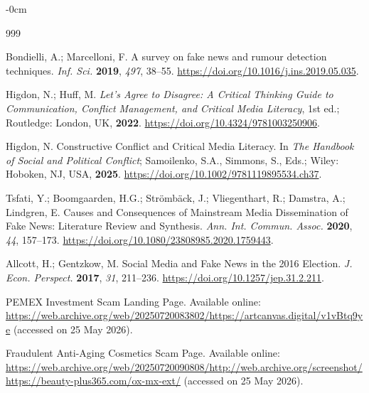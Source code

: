 \documentclass[informatics,article,submit,pdftex,moreauthors]{Definitions/mdpi}
\begin{document}
\begin{adjustwidth}{-\extralength}{0cm}


\begin{thebibliography}{999}
 
 
Bondielli, A.; Marcelloni, F. A survey on fake news and rumour detection techniques. \textit{Inf. Sci.} \textbf{2019}, \textit{497}, 38--55. \href{https://doi.org/10.1016/j.ins.2019.05.035}{https://doi.org/10.1016/j.ins.2019.05.035}.
 
Higdon, N.; Huff, M. \textit{Let's Agree to Disagree: A Critical Thinking Guide to Communication, Conflict Management, and Critical Media Literacy}, 1st ed.; Routledge: London, UK, \textbf{2022}. \href{https://doi.org/10.4324/9781003250906}{https://doi.org/10.4324/9781003250906}.
 
Higdon, N. Constructive Conflict and Critical Media Literacy. In \textit{The Handbook of Social and Political Conflict}; Samoilenko, S.A., Simmons, S., Eds.; Wiley: Hoboken, NJ, USA, \textbf{2025}. \href{https://doi.org/10.1002/9781119895534.ch37}{https://doi.org/10.1002/9781119895534.ch37}.
 
Tsfati, Y.; Boomgaarden, H.G.; Strömbäck, J.; Vliegenthart, R.; Damstra, A.; Lindgren, E. Causes and Consequences of Mainstream Media Dissemination of Fake News: Literature Review and Synthesis. \textit{Ann. Int. Commun. Assoc.} \textbf{2020}, \textit{44}, 157--173. \href{https://doi.org/10.1080/23808985.2020.1759443}{https://doi.org/10.1080/23808985.2020.1759443}.
 
Allcott, H.; Gentzkow, M. Social Media and Fake News in the 2016 Election. \textit{J. Econ. Perspect.} \textbf{2017}, \textit{31}, 211--236. \href{https://doi.org/10.1257/jep.31.2.211}{https://doi.org/10.1257/jep.31.2.211}.
 
PEMEX Investment Scam Landing Page. Available online: \url{https://web.archive.org/web/20250720083802/https://artcanvas.digital/v1vBtq9ye} (accessed on 25 May 2026).
 
Fraudulent Anti-Aging Cosmetics Scam Page. Available online: \url{https://web.archive.org/web/20250720090808/http://web.archive.org/screenshot/https://beauty-plus365.com/ox-mx-ext/} (accessed on 25 May 2026).
 

\end{thebibliography}
\end{adjustwidth}
\end{document}

